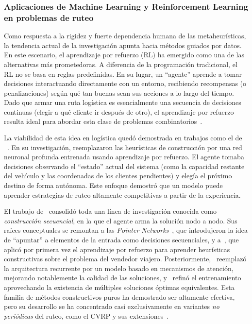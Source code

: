 \subsubsection{Aplicaciones de Machine Learning y Reinforcement Learning en problemas de ruteo} \label{sec:Aplicaciones}
Como respuesta a la rigidez y fuerte dependencia humana de las metaheurísticas, la tendencia actual de la investigación apunta hacia métodos guiados por datos. En este escenario, el aprendizaje por refuerzo (RL) ha emergido como una de las alternativas más prometedoras. A diferencia de la programación tradicional, el RL no se basa en reglas predefinidas. En su lugar, un \enquote{agente} aprende a tomar decisiones interactuando directamente con un entorno, recibiendo recompensas (o penalizaciones) según qué tan buenas sean sus acciones a lo largo del tiempo. Dado que armar una ruta logística es esencialmente una secuencia de decisiones continuas (elegir a qué cliente ir después de otro), el aprendizaje por refuerzo resulta ideal para abordar esta clase de problemas combinatorios~\cite{SuttonBarto2014}.

La viabilidad de esta idea en logística quedó demostrada en trabajos como el de ~\cite{nazari2018reinforcementlearningsolvingvehicle}. En su investigación, reemplazaron las heurísticas de construcción por una red neuronal profunda entrenada usando aprendizaje por refuerzo. El agente tomaba decisiones observando el \enquote{estado} actual del sistema (como la capacidad restante del vehículo y las coordenadas de los clientes pendientes) y elegía el próximo destino de forma autónoma. Este enfoque demostró que un modelo puede aprender estrategias de ruteo altamente competitivas a partir de la experiencia.

El trabajo de~\cite{nazari2018reinforcementlearningsolvingvehicle} consolidó toda una línea de investigación conocida como \textit{construcción secuencial}, en la que el agente arma la solución nodo a nodo. Sus raíces conceptuales se remontan a las \textit{Pointer Networks}~\cite{VinyalsPointerNetworks2015}, que introdujeron la idea de \enquote{apuntar} a elementos de la entrada como decisiones secuenciales, y a~\cite{Bello2017}, que aplicó por primera vez el aprendizaje por refuerzo para aprender heurísticas constructivas sobre el problema del vendedor viajero. Posteriormente,~\cite{Kool2019} reemplazó la arquitectura recurrente por un modelo basado en mecanismos de atención, mejorando notablemente la calidad de las soluciones, y~\cite{Kwon2020POMO} refinó el entrenamiento aprovechando la existencia de múltiples soluciones óptimas equivalentes. Esta familia de métodos constructivos puros ha demostrado ser altamente efectiva, pero su desarrollo se ha concentrado casi exclusivamente en variantes \textit{no periódicas} del ruteo, como el CVRP y sus extensiones~\cite{Bogyrbayeva2024}.

